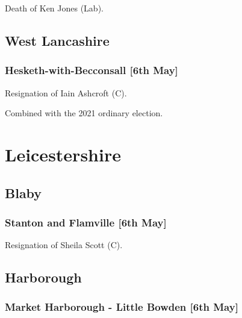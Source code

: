 \documentclass[a4paper,openany]{book}
\begin{document}
\begin{resultsiii}

Death of Ken Jones (Lab).

\subsection*{West Lancashire}

\subsubsection*{Hesketh-with-Becconsall \hspace*{\fill}\nolinebreak[1]%
	\enspace\hspace*{\fill}
	[6th May]}


Resignation of Iain Ashcroft (C).

Combined with the 2021 ordinary election.

\section{Leicestershire}

\subsection*{Blaby}

\subsubsection*{Stanton and Flamville \hspace*{\fill}\nolinebreak[1]%
	\enspace\hspace*{\fill}
	[6th May]}


Resignation of Sheila Scott (C).

\subsection*{Harborough}

\subsubsection*{Market Harborough - Little Bowden \hspace*{\fill}\nolinebreak[1]%
	\enspace\hspace*{\fill}
	[6th May]}


\end{resultsiii}
\end{document}
